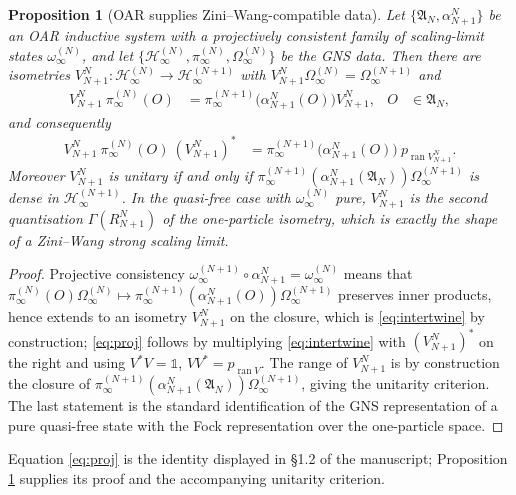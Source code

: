 \documentclass[11pt,a4paper]{article}
\newtheorem{prop}[thm]{Proposition}
\theoremstyle{definition}
\newcommand{\fA}{\mathfrak{A}}
\newcommand{\cH}{\mathcal{H}}
\newcommand{\1}{\mathds{1}}
\newcommand{\ran}{\operatorname{ran}}
\begin{document}
\begin{prop}[OAR supplies Zini--Wang-compatible data]
\label{prop:oarzw}
Let $\{\fA_{N},\alpha^{N}_{N+1}\}$ be an OAR inductive system with a projectively consistent family
of scaling-limit states $\omega^{(N)}_{\infty}$, and let
$\{\cH^{(N)}_{\infty},\pi^{(N)}_{\infty},\Omega^{(N)}_{\infty}\}$ be the GNS data. Then there are
isometries $V^{N}_{N+1}:\cH^{(N)}_{\infty}\rightarrow\cH^{(N+1)}_{\infty}$ with
$V^{N}_{N+1}\Omega^{(N)}_{\infty}=\Omega^{(N+1)}_{\infty}$ and
\begin{align}
\label{eq:intertwine}
V^{N}_{N+1}\!\ \pi^{(N)}_{\infty}(O) & = \pi^{(N+1)}_{\infty}\big(\alpha^{N}_{N+1}(O)\big)V^{N}_{N+1},
 & O & \in\fA_{N},
\end{align}
and consequently
\begin{align}
\label{eq:proj}
V^{N}_{N+1}\!\ \pi^{(N)}_{\infty}(O)\!\ (V^{N}_{N+1})^{*}
 & = \pi^{(N+1)}_{\infty}\big(\alpha^{N}_{N+1}(O)\big)\!\ p_{\ran V^{N}_{N+1}}.
\end{align}
Moreover $V^{N}_{N+1}$ is unitary if and only if
$\pi^{(N+1)}_{\infty}(\alpha^{N}_{N+1}(\fA_{N}))\Omega^{(N+1)}_{\infty}$ is dense in
$\cH^{(N+1)}_{\infty}$. In the quasi-free case with $\omega^{(N)}_{\infty}$ pure, $V^{N}_{N+1}$ is
the second quantisation $\Gamma(R^{N}_{N+1})$ of the one-particle isometry, which is exactly the
shape of a Zini--Wang \emph{strong} scaling limit.
\end{prop}

\begin{proof}
Projective consistency $\omega^{(N+1)}_{\infty}\circ\alpha^{N}_{N+1}=\omega^{(N)}_{\infty}$ means
that $\pi^{(N)}_{\infty}(O)\Omega^{(N)}_{\infty}\mapsto
\pi^{(N+1)}_{\infty}(\alpha^{N}_{N+1}(O))\Omega^{(N+1)}_{\infty}$ preserves inner products, hence
extends to an isometry $V^{N}_{N+1}$ on the closure, which is \eqref{eq:intertwine} by construction;
\eqref{eq:proj} follows by multiplying \eqref{eq:intertwine} with $(V^{N}_{N+1})^{*}$ on the right
and using $V^{*}V=\1$, $VV^{*}=p_{\ran V}$. The range of $V^{N}_{N+1}$ is by construction the closure
of $\pi^{(N+1)}_{\infty}(\alpha^{N}_{N+1}(\fA_{N}))\Omega^{(N+1)}_{\infty}$, giving the unitarity
criterion. The last statement is the standard identification of the GNS representation of a pure
quasi-free state with the Fock representation over the one-particle space.
\end{proof}

Equation \eqref{eq:proj} is the identity displayed in \S1.2 of the manuscript; Proposition
\ref{prop:oarzw} supplies its proof and the accompanying unitarity criterion.
\end{document}
